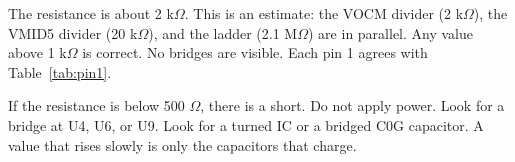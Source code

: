 \begin{samepage}
\begin{table}[H]
\end{table}
\begin{pass}
The resistance is about 2 k$\Omega$. This is an estimate: the VOCM divider (2 k$\Omega$), the VMID5 divider (20 k$\Omega$), and the ladder (2.1 M$\Omega$) are in parallel. Any value above 1 k$\Omega$ is correct. No bridges are visible. Each pin 1 agrees with Table~\ref{tab:pin1}.
\end{pass}
\begin{fail}
If the resistance is below 500 $\Omega$, there is a short. Do not apply power. Look for a bridge at U4, U6, or U9. Look for a turned IC or a bridged C0G capacitor. A value that rises slowly is only the capacitors that charge.
\end{fail}
\end{samepage}

\clearpage
